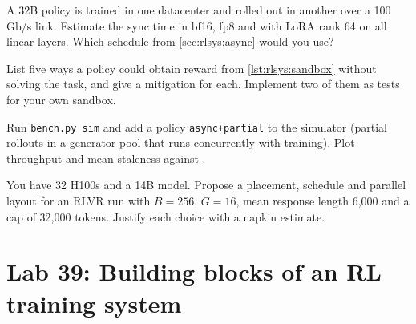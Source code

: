 \begin{exercise}
A 32B policy is trained in one datacenter and rolled out in another over a 100\,Gb/s link.
Estimate the sync time in bf16, fp8 and with LoRA rank 64 on all linear layers. Which
schedule from \cref{sec:rlsys:async} would you use?
\end{exercise}

\begin{exercise}
List five ways a policy could obtain reward from \cref{lst:rlsys:sandbox} without solving the
task, and give a mitigation for each. Implement two of them as tests for your own sandbox.
\end{exercise}

\begin{exercise}[Measurement]
Run \texttt{bench.py sim} and add a policy \texttt{async+partial} to the simulator (partial
rollouts in a generator pool that runs concurrently with training). Plot throughput and
mean staleness against .
\end{exercise}

\begin{exercise}[Design]
You have 32 H100s and a 14B model. Propose a placement, schedule and parallel layout for an
RLVR run with $B=256$, $G=16$, mean response length 6{,}000 and a cap of 32{,}000 tokens.
Justify each choice with a napkin estimate.
\end{exercise}

\section{Lab 39: Building blocks of an RL training system}\label{sec:rlsys:lab}

